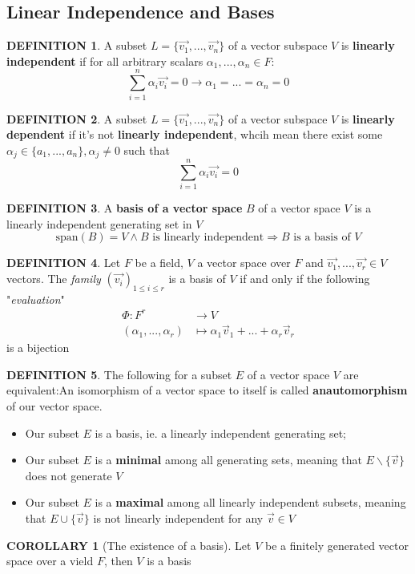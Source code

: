 \documentclass[12pt]{article}
\theoremstyle{definition}
\newtheorem{definition}{DEFINITION}[subsection]
\newtheorem{corollary}{COROLLARY}[subsection]
\begin{document}
\subsection{Linear Independence and Bases}
\begin{definition}
    A subset $L = \{\overrightarrow{v_1},...,\overrightarrow{v_n}\}$ of a vector subspace $V$ is \textbf{linearly independent} if for all arbitrary scalars $\alpha_1, ..., \alpha_n \in F$:
    $$\sum_{i=1}^n{\alpha_i\overrightarrow{v_i}} = 0 \rightarrow \alpha_1 = ... = \alpha_n = 0$$
\end{definition}
\begin{definition}
    A subset $L = \{\overrightarrow{v_1},...,\overrightarrow{v_n}\}$ of a vector subspace $V$ is \textbf{linearly dependent} if it's not \textbf{linearly independent}, whcih mean there exist some $\alpha_j \in \{a_1, ..., a_n\}, \alpha_j \neq 0$ such that  $$\sum_{i=1}^n{\alpha_i\overrightarrow{v_i}} = 0$$
\end{definition}
\begin{definition}
    A \textbf{basis of a vector space} $B$ of a vector space $V$ is a linearly independent generating set in $V$
    \[
        \text{span}(B) = V \wedge B \text{ is linearly independent} \Rightarrow \text{$B$ is a basis of $V$}
    \]
\end{definition}
\begin{definition}
    Let $F$ be a field, $V$ a vector space over $F$ and $\overrightarrow{v_1},...,\overrightarrow{v_r} \in V$ vectors. The \textit{family} $(\overrightarrow{v_i})_{1\leq i\leq r}$ is a basis of $V$ if and only if the following "\textit{evaluation}"
    \[
        \begin{split}
            \Phi : F^r &\rightarrow V\\
            (\alpha_1,...,\alpha_r) &\mapsto \alpha_1\overrightarrow{v}_1 + ... + \alpha_r\overrightarrow{v}_r
        \end{split}
    \]
    is a bijection
\end{definition}
\begin{definition}
    The following for a subset $E$ of a vector space $V$ are equivalent:An isomorphism of a vector space to itself is called \textbf{anautomorphism} of our vector space.
    \begin{itemize}
        \item Our subset $E$ is a basis, ie. a linearly independent generating set;
        \item Our subset $E$ is a \textbf{minimal} among all generating sets, meaning that $E\backslash\{\overrightarrow{v}\}$ does not generate $V$
        \item Our subset $E$ is a \textbf{maximal} among all linearly independent subsets, meaning that $E\cup\{\overrightarrow{v}\}$ is not linearly independent for any $\overrightarrow{v} \in V$
    \end{itemize}
\end{definition}
\begin{corollary}[The existence of a basis]
    Let $V$ be a finitely generated vector space over a vield $F$, then $V$ is a basis
\end{corollary}
\end{document}
